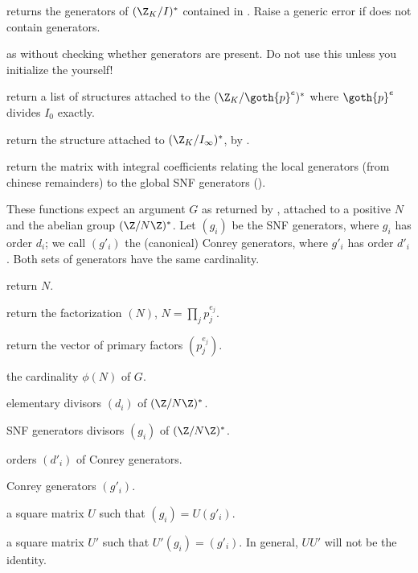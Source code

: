  returns the generators of $(\Z_K/I)^*$
contained in . Raise a generic error if  does not contain
generators.

 as  without
checking whether generators are present. Do not use this unless
you initialize the  yourself!

 return a list of structures attached to the
$(\Z_K/\goth{p}^e)^*$ where $\goth{p}^e$ divides $I_0$ exactly.

 return the structure attached
to $(\Z_K/I_\infty)^*$, by .

 return the matrix with integral coefficients
relating the local generators (from chinese remainders) to the global
SNF generators ().


These functions expect an argument $G$ as returned by ,
attached to a positive $N$ and the abelian group $(\Z/N\Z)^*$.
Let $(g_i)$ be the SNF generators, where $g_i$ has order $d_i$;
we call $(g'_i)$ the (canonical) Conrey generators, where $g'_i$ has order
$d'_i$. Both sets of generators have the same cardinality.

 return $N$.

 return the factorization $(N)$,
$N = \prod_j p_j^{e_j}$.

 return the vector of primary factors
$(p_j^{e_j})$.

 the cardinality $\phi(N)$ of $G$.

 elementary divisors $(d_i)$ of $(\Z/N\Z)^*$.

 SNF generators divisors $(g_i)$
of $(\Z/N\Z)^*$.

 orders $(d'_i)$ of Conrey generators.

 Conrey generators $(g'_i)$.

 a square matrix $U$ such that
$(g_i) = U(g'_i)$.

 a square matrix $U'$ such that
$U'(g_i) = (g'_i)$. In general, $UU'$ will not be the identity.

